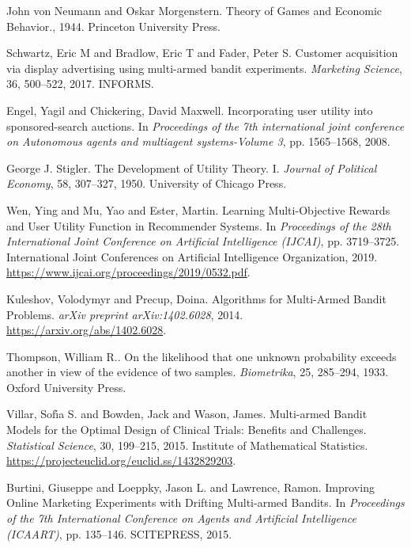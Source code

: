 \begin{thebibliography}{99}
 John von Neumann and Oskar Morgenstern. {T}heory of {G}ames and {E}conomic {B}ehavior., 1944. Princeton University Press.

 Schwartz, Eric M and Bradlow, Eric T and Fader, Peter S. {C}ustomer acquisition via display advertising using multi-armed bandit experiments. \textit{Marketing Science}, 36, 500--522, 2017. INFORMS.

 Engel, Yagil and Chickering, David Maxwell. {I}ncorporating user utility into sponsored-search auctions. In \textit{Proceedings of the 7th international joint conference on Autonomous agents and multiagent systems-Volume 3}, pp. 1565--1568, 2008.

 George J. Stigler. {T}he {D}evelopment of {U}tility {T}heory. {I}. \textit{Journal of Political Economy}, 58, 307--327, 1950. University of Chicago Press.

 Wen, Ying and Mu, Yao and Ester, Martin. {L}earning {M}ulti-{O}bjective {R}ewards and {U}ser {U}tility {F}unction in {R}ecommender {S}ystems. In \textit{Proceedings of the 28th International Joint Conference on Artificial Intelligence (IJCAI)}, pp. 3719--3725. International Joint Conferences on Artificial Intelligence Organization, 2019. \url{https://www.ijcai.org/proceedings/2019/0532.pdf}.

 Kuleshov, Volodymyr and Precup, Doina. {A}lgorithms for {M}ulti-{A}rmed {B}andit {P}roblems. \textit{arXiv preprint arXiv:1402.6028}, 2014. \url{https://arxiv.org/abs/1402.6028}.

 Thompson, William R.. {O}n the likelihood that one unknown probability exceeds another in view of the evidence of two samples. \textit{Biometrika}, 25, 285--294, 1933. Oxford University Press.

 Villar, Sof{\i}́a S. and Bowden, Jack and Wason, James. {M}ulti-armed {B}andit {M}odels for the {O}ptimal {D}esign of {C}linical {T}rials: {B}enefits and {C}hallenges. \textit{Statistical Science}, 30, 199--215, 2015. Institute of Mathematical Statistics. \url{https://projecteuclid.org/euclid.ss/1432829203}.

 Burtini, Giuseppe and Loeppky, Jason L. and Lawrence, Ramon. {I}mproving {O}nline {M}arketing {E}xperiments with {D}rifting {M}ulti-armed {B}andits. In \textit{Proceedings of the 7th International Conference on Agents and Artificial Intelligence (ICAART)}, pp. 135--146. SCITEPRESS, 2015.


\end{thebibliography}
